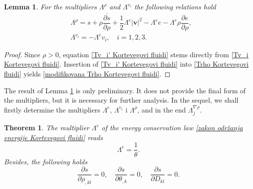 \documentclass[a4paper,fleqn]{cas-sc}
\newtheorem{theorem}{Theorem}[section]
\newtheorem{lemma}{Lemma}[section]
\theoremstyle{definition}
\begin{document}
\begin{lemma} \label{Lema:Lambda1}
	For the multipliers $\Lambda^{\rho}$ and $\Lambda^{v_i}$ the following relations hold 
	\begin{align}
		\label{modifikovana Trho Kortevegovi fluidi}
		& \Lambda^\rho = s + \rho\overline{\dfrac{\partial s}{\partial\rho}} 
		+ \dfrac{1}{2}\Lambda^e|\mathbf{v}|^2 - \Lambda^ e e 
		- \Lambda^e \rho \dfrac{\partial e}{\partial\rho},
		\\
		\label{Tv_i' Kortevegovi fluidi}
		& \Lambda^{v_i}=-\Lambda^e v_i, \quad i = 1, 2, 3.
	\end{align}
\end{lemma}

\begin{proof}
	Since $\rho > 0$, equation \eqref{Tv_i' Kortevegovi fluidi} stems directly from \eqref{Tv_i Kortevegovi fluidi}. Insertion of \eqref{Tv_i' Kortevegovi fluidi} into \eqref{Trho Kortevegovi fluidi} yields \eqref{modifikovana Trho Kortevegovi fluidi}. 
\end{proof}

The result of Lemma \ref{Lema:Lambda1} is only preliminary. It does not provide the final form of the multipliers, but it is necessary for further analysis. In the sequel, we shall firstly determine the multipliers $\Lambda^{e}$, $\Lambda^{v_i}$ i $\Lambda^{\rho}$, and in the end $\Lambda^{\nabla\rho}_j$. 
\begin{theorem} \label{Te:Lambda-e}
	The multiplier $\Lambda^{e}$ of the energy conservation law \eqref{zakon održanja energije Kortevegovi fluidi} reads
	\begin{equation} \label{mnozitelj Lambda-e Kortevegovi fluidi}
		\Lambda^{e} = \dfrac{1}{\theta}. 
	\end{equation}
	Besides, the following holds
	\begin{equation} \label{s-argumenti Kortevegovi fluidi}
		\dfrac{\partial s}{\partial \rho_{,kl}} = 0, \quad 
		\dfrac{\partial s}{\partial \theta_{,k}} = 0, \quad
		\dfrac{\partial s}{\partial D_{kl}} = 0.
	\end{equation}
\end{theorem}
\end{document}
